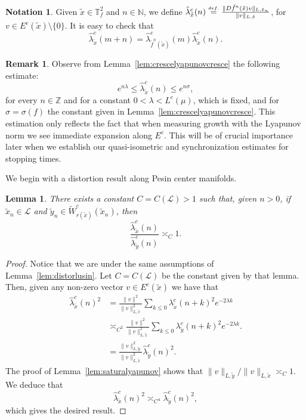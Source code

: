 \documentclass[a4paper,11pt,reqno]{amsart}
\def\tW{\widetilde W}
\newcommand{\Z}{{\mathbb Z}}
\newcommand{\N}{{\mathbb N}}
\newcommand{\TTf}{{\mathbb{T}_f^2}}
\newcommand{\cL}{{\mathcal L}}
\newcommand{\eqdef}{\stackrel{\scriptscriptstyle\textrm def.}{=}}
\newcommand{\tix}{\tilde{x}}
\newcommand{\tif}{\tilde{f}}
\newtheorem{lemma}[theorem]{Lemma}
\theoremstyle{definition}
\newtheorem{remark}{Remark}
\newtheorem*{notation}{Notation}
\begin{document}
\begin{notation}
 Given $\tix\in\TTf$ and $n\in\N$, we define $\hat{\lambda}^c_{\tix}(n) \eqdef \frac{\|D\tif^n(\tix)v\|_{L,\tix_n}}{\|v\|_{L,\tix}}$, for  $v\in E^c(\tix)\setminus\{0\}$.
 It is easy to check that
 \begin{equation}
     \label{eq:cocycle}
     \hat{\lambda}^c_{\tix}(m+n) = \hat{\lambda}^c_{\tilde{f}^n(\tilde{x})}(m) \hat{\lambda}^c_{\tix}(n). 
 \end{equation}
\end{notation}
\begin{remark}
\label{rem:lyapunov}
Observe from Lemma~\ref{lem:crescelyapunovcresce} the following estimate: 
\[
e^{n\lambda}\leq\hat{\lambda}^c_{\tix}(n)\leq e^{n\sigma},
\]
for every $n\in\Z$ and for a constant $0<\lambda<L^c(\mu)$, which is fixed, and for $\sigma=\sigma(f)$ the constant given in Lemma~\ref{lem:crescelyapunovcresce}. This estimation only reflects the fact that when measuring growth with the Lyapunov norm we see immediate expansion along $E^c$. This will be of crucial importance later when we establish our quasi-isometric and synchronization estimates for stopping times. 
\end{remark}


We begin with a distortion result along Pesin center manifolds. 

\begin{lemma}
    \label{lem:distorlyp}
There exists a constant $C=C(\cL)>1$ such that, given $n>0$, if $\tix_n\in\cL$ and $\tilde{y}_n\in\tW^c_{r(\tix)}(\tix_n)$, then 
\[
\frac{\hat{\lambda}^c_{\tix}(n)}{\hat{\lambda}^c_{\tilde{y}}(n)}\asymp_C 1.
\]
\end{lemma}
\begin{proof}
Notice that we are under the same assumptions of Lemma~\ref{lem:distorlusin}. Let $C=C(\cL)$ be the constant given by that lemma. Then, given any non-zero vector $v\in E^c(\tix)$ we have that
\begin{align*}
        \hat{\lambda}^c_{\tix}(n)^2&=\frac{\|v\|^2}{\|v\|^2_{L,\tix}}\sum_{k\leq 0}\lambda^c_{\tix}(n+k)^2e^{-2\lambda k}\nonumber\\
    &\asymp_{C^2}\frac{\|v\|^2}{\|v\|^2_{L,\tix}}\sum_{k\leq 0}\lambda^c_{\tilde{y}}(n+k)^2e^{-2\lambda k}.\nonumber\\
    &=\frac{\|v\|^2_{L,\tilde{y}}}{\|v\|^2_{L,\tix}}\hat{\lambda}^c_{\tilde{y}}(n)^2.\nonumber
\end{align*}
The proof of Lemma~\ref{lem:saturalyapunov} shows that $\|v\|_{L,\tilde{y}}/\|v\|_{L,\tix}\asymp_{C} 1$. We deduce that 
\[
\hat{\lambda}^c_{\tix}(n)^2\asymp_{C^4}\hat{\lambda}^c_{\tilde{y}}(n)^2,
\]
which gives the desired result. 
\end{proof}
\end{document}
